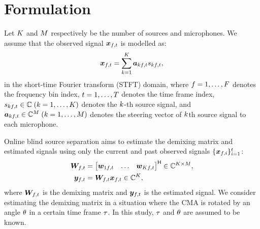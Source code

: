 \documentclass[twocolumn,9pt,dvipdfmx]{article}
\begin{document}
\section{Formulation}
Let $K$ and $M$ respectively be the number of sources and microphones.
We assume that the observed signal $\Obs _{\ft}$ is modelled as:
\begin{equation}
  \Obs _{\ft} = \sum _{\src=1} ^{\Src} \steer _{\src\ft} \sig _{\src\ft},
\end{equation}
in the short-time Fourier transform (STFT) domain,
where $f = 1, \dots, F$ denotes the frequency bin index,
$t = 1, \dots, T$ denotes the time frame index,
$\sig _{\src\ft} \in \C\; (\src = 1, \dots, \Src)$ denotes the $k$-th source signal, and
$\steer _{\src\ft} \in \C ^{\Mic}\; (\src = 1, \dots, \Mic)$ denotes the steering vector of $k$th source signal to each microphone.

Online blind source separation aims to estimate the demixing matrix and estimated signals using only the current and past observed signals $\{\bm{x} _{f,i}\} _{i=1} ^{t}$:
\begin{align}
  \Demix _{\ft} &= \begin{bmatrix} \demix _{1\ft} & \dots & \demix _{\Src\ft} \end{bmatrix} ^{\hermite} \in \C ^{\Src \times \Mic}, \\
  \Est _{\ft} &= \Demix _{\ft} \Obs _{\ft} \in \C ^{\Src},
\end{align}
where $\Demix _{\ft}$ is the demixing matrix and $\Est _{\ft}$ is the estimated signal.
We consider estimating the demixing matrix in a situation where the CMA is rotated by an angle $\theta$ in a certain time frame $\tau$.
In this study, $\tau$ and $\theta$ are assumed to be known.
\end{document}
